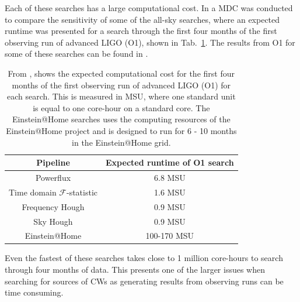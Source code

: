 Each of these searches has a large computational cost. In \citep{walsh2016ComparisonMethods} a
\gls{MDC} was conducted to compare the sensitivity of some of the all-sky 
searches, where an expected runtime was presented for a search through the first four months of the first observing run of advanced \gls{LIGO} (O1), shown in Tab.~\ref{searchcw:search:semi:cost}. 
The results from O1 for some of these searches can be found in \citep{ligoscientificcollaborationandvirgocollaboration2017AllskySearch}.  
%
\begin{table}
	\centering
        \caption[Computational cost of \gls{CW} searches.]{From
\citep{walsh2016ComparisonMethods}, shows the expected computational cost for the first
four months of the first observing run of advanced \gls{LIGO} (O1) for each search. This is measured in \gls{MSU}, where one
standard unit is equal to one core-hour on a standard core.
The Einstein@Home searches uses the computing resources
of the Einstein@Home project and is designed to run for 6 - 10 months in the
Einstein@Home grid.
  \label{searchcw:search:semi:cost}}
	
        \bgroup {} \centering \begin{tabular}{|c c|} \hline
Pipeline & Expected runtime of O1 search \\ \hline Powerflux & 6.8 MSU \\

		Time domain $\mathcal{F}$-statistic & 1.6 MSU\\

		Frequency Hough & 0.9 MSU \\

		Sky Hough & 0.9 MSU\\
		\hline
		Einstein@Home & 100-170 MSU\\
		\hline

	\end{tabular}
	\egroup
\end{table}
%
Even the fastest of these searches takes close to 1 million core-hours to
search through four months of data. 
This presents one of the larger issues when searching for sources of \glspl{CW} as generating results from observing runs can be time consuming. 


